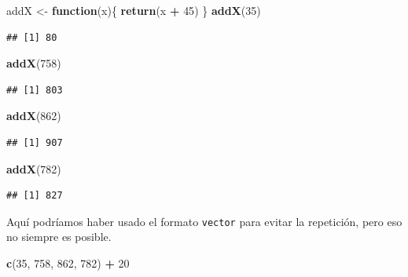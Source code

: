 \documentclass[
]{book}
\newenvironment{Shaded}{\begin{snugshade}}{\end{snugshade}}
\newcommand{\ControlFlowTok}[1]{\textcolor[rgb]{0.13,0.29,0.53}{\textbf{#1}}}
\newcommand{\DecValTok}[1]{\textcolor[rgb]{0.00,0.00,0.81}{#1}}
\newcommand{\KeywordTok}[1]{\textcolor[rgb]{0.13,0.29,0.53}{\textbf{#1}}}
\newcommand{\NormalTok}[1]{#1}
\newcommand{\OperatorTok}[1]{\textcolor[rgb]{0.81,0.36,0.00}{\textbf{#1}}}
\newcommand{\StringTok}[1]{\textcolor[rgb]{0.31,0.60,0.02}{#1}}
\begin{document}
\begin{Shaded}
\begin{Highlighting}[]
\NormalTok{addX <-}\StringTok{ }\ControlFlowTok{function}\NormalTok{(x)\{}
  \KeywordTok{return}\NormalTok{(x }\OperatorTok{+}\StringTok{ }\DecValTok{45}\NormalTok{)}
\NormalTok{\}}
\KeywordTok{addX}\NormalTok{(}\DecValTok{35}\NormalTok{)}
\end{Highlighting}
\end{Shaded}

\begin{verbatim}
## [1] 80
\end{verbatim}

\begin{Shaded}
\begin{Highlighting}[]
\KeywordTok{addX}\NormalTok{(}\DecValTok{758}\NormalTok{)}
\end{Highlighting}
\end{Shaded}

\begin{verbatim}
## [1] 803
\end{verbatim}

\begin{Shaded}
\begin{Highlighting}[]
\KeywordTok{addX}\NormalTok{(}\DecValTok{862}\NormalTok{)}
\end{Highlighting}
\end{Shaded}

\begin{verbatim}
## [1] 907
\end{verbatim}

\begin{Shaded}
\begin{Highlighting}[]
\KeywordTok{addX}\NormalTok{(}\DecValTok{782}\NormalTok{)}
\end{Highlighting}
\end{Shaded}

\begin{verbatim}
## [1] 827
\end{verbatim}

Aquí podríamos haber usado el formato \texttt{vector} para evitar la repetición, pero eso no siempre es posible.

\begin{Shaded}
\begin{Highlighting}[]
\KeywordTok{c}\NormalTok{(}\DecValTok{35}\NormalTok{, }\DecValTok{758}\NormalTok{, }\DecValTok{862}\NormalTok{, }\DecValTok{782}\NormalTok{) }\OperatorTok{+}\StringTok{ }\DecValTok{20}
\end{Highlighting}
\end{Shaded}
\end{document}
